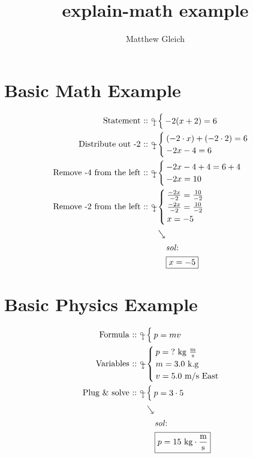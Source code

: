 \documentclass{report}
\title{explain-math example}
\author{Matthew Gleich}
\date{}
\begin{document}
    \maketitle

    \section{Basic Math Example}
        \begin{align*}
            \statement{-2(x + 2) = 6}
            \explain{Distribute out -2}{
                \step{ (-2 \cdot x) + (-2 \cdot 2) = 6 }
                \step{ -2x - 4 = 6 }
            }
            \explain{Remove -4 from the left}{
                \step{ -2x - 4 + 4 = 6 + 4 }
                \step{ -2x = 10 }
            }
            \explain{Remove -2 from the left}{
                \step{ \frac{-2x}{-2} = \frac{10}{-2} }
                \step{ \frac{-2x}{-2} = \frac{10}{-2} }
                \step{ x = -5 }
            }
            \sol{x = -5}
        \end{align*}

    \section{Basic Physics Example}
        \begin{align*}
            \formula{p = mv}
            \variables{
                \varu{p}{\text{?}}{kg $ \frac{\text{m}}{\text{s}} $}
                \varu{m}{3.0}{k.g}
                \varu{v}{5.0}{m/s East}
            }
            \explain{Plug \& solve}{p = 3 \cdot 5}
            \sol{p = 15 \text{ kg} \cdot \frac{\text{m}}{\text{s}}}
        \end{align*}
\end{document}
